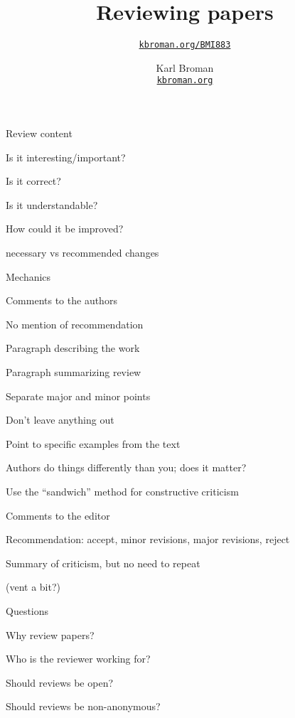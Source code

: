 \documentclass[aspectratio=169,12pt,t]{beamer}
\title{Reviewing papers}
\subtitle{}
\author{\href{https://kbroman.org/BMI883}{\tt kbroman.org/BMI883} }
\institute{}
\date{\small \hspace{3in} Karl Broman \\
  \hspace{3in} \href{https://kbroman.org}{\color{foreground}
    \small \tt kbroman.org}}
\begin{document}
{
\frame{
  \titlepage
} }



\begin{frame}{Review content}

\bbi
\item Is it interesting/important?
\item Is it correct?
\item Is it understandable?
\item How could it be improved?
  \bi
\item necessary vs recommended changes
  \ei
  \ei

\end{frame}




\begin{frame}{Mechanics}


  \bbi
\item Comments to the authors
  \bi
\item No mention of recommendation
\item Paragraph describing the work
\item Paragraph summarizing review
\item Separate major and minor points
\item Don't leave anything out
\item Point to specific examples from the text
\item Authors do things differently than you; {\hilit does it matter}?
\item Use the ``sandwich'' method for constructive criticism
  \ei
\item Comments to the editor
  \bi
  \item Recommendation: accept, minor revisions, major revisions, reject
  \item Summary of criticism, but no need to repeat
  \item (vent a bit?)
  \ei
  \ei

\end{frame}



\begin{frame}{Questions}


  \bbi
\item Why review papers?
\item Who is the reviewer working for?
\item Should reviews be open?
\item Should reviews be non-anonymous?
  \ei

\end{frame}
\end{document}
